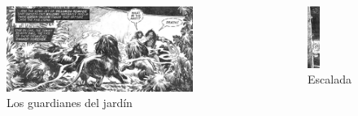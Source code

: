 \begin{frame}{}
\begin{columns}
    \begin{figure}[htb]
    \centering
        \includegraphics[width=0.85\textwidth]{img/res/09}
        \caption{Los guardianes del jardín}
    \end{figure}    
    \begin{figure}[htb]
    \centering
        \includegraphics[width=0.28\textwidth]{img/res/10}
        \caption{Escalada}
    \end{figure}    
\end{columns}
\end{frame}

